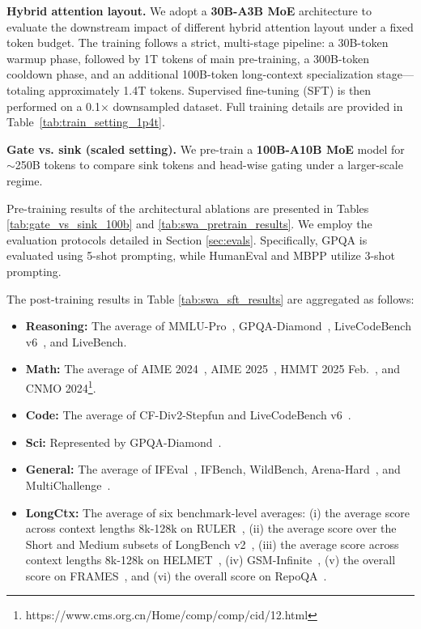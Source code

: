 \noindent\textbf{Hybrid attention layout.}
We adopt a \textbf{30B-A3B MoE} architecture to evaluate the downstream impact of different hybrid attention layout under a fixed token budget. The training follows a strict, multi-stage pipeline: a 30B-token warmup phase, followed by 1T tokens of main pre-training, a 300B-token cooldown phase, and an additional 100B-token long-context specialization stage—totaling approximately 1.4T tokens. Supervised fine-tuning (SFT) is then performed on a 0.1× downsampled dataset. Full training details are provided in Table~\ref{tab:train_setting_1p4t}.

\noindent\textbf{Gate vs. sink (scaled setting).}
We pre-train a \textbf{100B-A10B MoE} model for $\sim$250B tokens to compare sink tokens and head-wise gating under a larger-scale regime.


Pre-training results of the architectural ablations are presented in Tables \ref{tab:gate_vs_sink_100b} and \ref{tab:swa_pretrain_results}.
We employ the evaluation protocols detailed in Section \ref{sec:evals}. Specifically, GPQA \cite{rein2023gpqa} is evaluated using 5-shot prompting, while HumanEval \cite{chen2021evaluating} and MBPP \cite{austin2021program} utilize 3-shot prompting.


The post-training results in Table \ref{tab:swa_sft_results} are aggregated as follows:
\begin{itemize}[leftmargin=*,nosep]
\item \textbf{Reasoning:} The average of MMLU-Pro~\cite{wang2024mmlupro}, GPQA-Diamond~\cite{rein2023gpqa}, LiveCodeBench v6~\cite{jain2024livecodebench}, and LiveBench\cite{white2025livebenchchallengingcontaminationlimitedllm}.
\item \textbf{Math:} The average of AIME 2024~\cite{AIME}, AIME 2025~\cite{AIME25}, HMMT 2025 Feb.~\cite{balunovic2025matharena}, and CNMO 2024\footnote{https://www.cms.org.cn/Home/comp/comp/cid/12.html}.
\item \textbf{Code:} The average of CF-Div2-Stepfun and LiveCodeBench v6~\cite{jain2024livecodebench}.
\item \textbf{Sci:} Represented by GPQA-Diamond~\cite{rein2023gpqa}.
\item \textbf{General:} The average of IFEval~\cite{zhou2023instructionfollowingevaluationlargelanguage}, IFBench\cite{pyatkin2025generalizing}, WildBench\cite{lin2024wildbenchbenchmarkingllmschallenging}, Arena-Hard~\cite{arenahard2024}, and MultiChallenge~\cite{sirdeshmukh2025multichallengerealisticmultiturnconversation}.
\item \textbf{LongCtx:} The average of six benchmark-level averages: (i) the average score across context lengths 8k-128k on RULER~\cite{hsieh2024ruler}, (ii) the average score over the Short and Medium subsets of LongBench v2~\cite{bai2024longbenchv2}, (iii) the average score across context lengths 8k-128k on HELMET~\cite{yen2024helmet}, (iv) GSM-Infinite~\cite{zhou2025gsminfinite}, (v) the overall score on FRAMES~\cite{krishna2025fact}, and (vi) the overall score on RepoQA~\cite{liu2024repoqaevaluatinglongcontext}.

\end{itemize}


